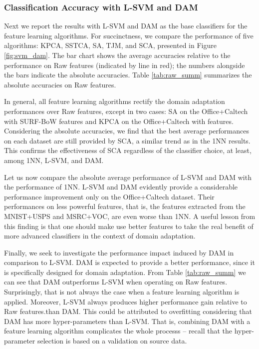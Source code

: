 \documentclass[10pt,journal,compsoc]{IEEEtran}
\begin{document}
\vspace{-1em}
\subsubsection{Classification Accuracy with L-SVM and DAM}
Next we report the results with L-SVM and DAM as the base classifiers for the feature learning algorithms.
For succinctness, we compare the performance of five algorithms: KPCA, SSTCA, SA, TJM, and SCA, presented in Figure \ref{fig:svm_dam}.
The bar chart shows the average accuracies relative to the performance on Raw features (indicated by line  in red); the numbers alongside the bars indicate the absolute accuracies.
Table \ref{tab:raw_summ} summarizes the absolute accuracies on Raw features.


In general, all feature learning algorithms rectify the domain adaptation performances over Raw features, except in two cases: 
SA on the Office+Caltech with SURF-BoW features and KPCA on the Office+Caltech with  features.
Considering the absolute accuracies, we find that the best average performances on each dataset are still provided by SCA, a similar trend as in the 1NN results.
This confirms the effectiveness of SCA regardless of the classifier choice, at least, among 1NN, L-SVM, and DAM.


Let us now compare the absolute average performance of L-SVM and DAM with the performance of 1NN. 
L-SVM and DAM evidently provide a considerable performance improvement only on the Office+Caltech dataset.
Their performances on less powerful features, that is, the features extracted from the MNIST+USPS and MSRC+VOC, are even worse than 1NN.
A useful lesson from this finding is that one should make use better features to take the real benefit of more advanced classifiers in the context of domain adaptation.


Finally, we seek to investigate the performance impact induced by DAM in comparison to L-SVM.
DAM is expected to provide a better performance, since it is specifically designed for domain adaptation.
From Table \ref{tab:raw_summ} we can see that DAM outperforms L-SVM when operating on Raw features.
Surprisingly, that is not always the case when a feature learning algorithm is applied.
Moreover, L-SVM always produces higher performance gain relative to Raw features.than DAM.
This could be attributed to overfitting considering that DAM has more hyper-parameters than L-SVM.
That is, combining DAM with a feature learning algorithm complicates the whole processs -- recall that the hyper-parameter selection is based on a validation on source data.
\end{document}
